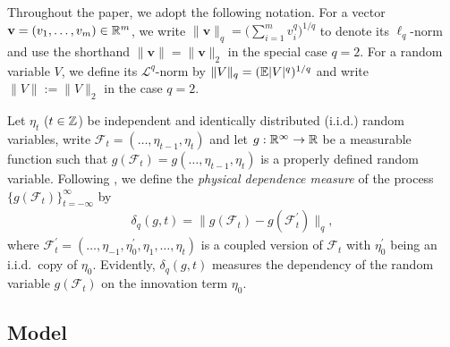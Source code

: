 \documentclass[a4paper,12pt]{article}
\begin{document}
Throughout the paper, we adopt the following notation. For a vector $\mathbf{v} = (v_1, \ldots, v_m)\in\mathbb{R}^m$, we write $\|\mathbf{v}\|_q = \big(\sum_{i=1}^m v_i^q\big)^{1/q}$ to denote its $\ell_q$-norm and use the shorthand $\|\mathbf{v}\| = \|\mathbf{v}\|_2$ in the special case $q = 2$. For a random variable $V$, we define its $\mathcal{L}^q$-norm by $\|V\|_q = (\mathbb{E} |V|^q)^{1/q}$ and write $\|V\| := \|V\|_2$ in the case $q = 2$.


Let $\eta_t$ ($t \in \mathbb{Z}$) be independent and identically distributed ($\text{i.i.d.}$) random variables, write $\mathcal{F}_t  = (\ldots, \eta_{t-1}, \eta_t)$ and let $g: \mathbb{R}^\infty \to \mathbb{R}$ be a measurable function such that $g(\mathcal{F}_t) = g(\ldots, \eta_{t-1}, \eta_t)$ is a properly defined random variable. Following \cite{Wu2005}, we define the \textit{physical dependence measure} of the process $\{g(\mathcal{F}_t)\}_{t=-\infty}^\infty$ by
\begin{align}\label{eq:physical_dep}
\delta_q(g, t) = \| g(\mathcal{F}_t) - g(\mathcal{F}_t^\prime) \|_q,
\end{align}
where $\mathcal{F}_t^\prime  = (\ldots, \eta_{-1}, \eta^\prime_0, \eta_1, \ldots, \eta_t)$ is a coupled version of $\mathcal{F}_t$ with $\eta_0^\prime$ being an i.i.d.\ copy of $\eta_0$. Evidently, $\delta_q(g, t)$ measures the dependency of the random variable $g(\mathcal{F}_t)$ on the innovation term $\eta_0$. %


\subsection{Model}\label{subsec:model_setting}
\end{document}
